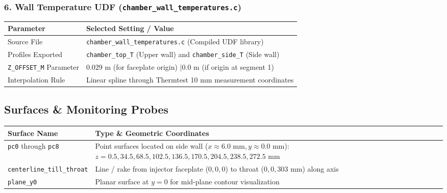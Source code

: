 \documentclass[11pt,a4paper]{article}
\begin{document}
\subsubsection*{6. Wall Temperature UDF (\texttt{chamber\_wall\_temperatures.c})}

\begin{tabularx}{\textwidth}{L{4.5cm} Y}
\toprule
\textbf{Parameter} & \textbf{Selected Setting / Value} \\
\midrule
Source File & \texttt{chamber\_wall\_temperatures.c} (Compiled UDF library) \\
Profiles Exported & \texttt{chamber\_top\_T} (Upper wall) and \texttt{chamber\_side\_T} (Side wall) \\
\texttt{Z\_OFFSET\_M} Parameter & $0.029\text{ m}$ (for faceplate origin) \quad$\vert$\quad $0.0\text{ m}$ (if origin at segment 1) \\
Interpolation Rule & Linear spline through Thermtest 10 mm measurement coordinates \\
\bottomrule
\end{tabularx}

\subsection{Surfaces \& Monitoring Probes}
\begin{tabularx}{\textwidth}{L{4.8cm} Y}
\toprule
\textbf{Surface Name} & \textbf{Type \& Geometric Coordinates} \\
\midrule
\texttt{pc0} through \texttt{pc8} & Point surfaces located on side wall ($x \approx 6.0\text{ mm}, y \approx 0.0\text{ mm}$): \newline $z = 0.5, 34.5, 68.5, 102.5, 136.5, 170.5, 204.5, 238.5, 272.5\text{ mm}$ \\
\texttt{centerline\_till\_throat} & Line / rake from injector faceplate ($0,0,0$) to throat ($0,0,303\text{ mm}$) along axis \\
\texttt{plane\_y0} & Planar surface at $y = 0$ for mid-plane contour visualization \\
\bottomrule
\end{tabularx}
\end{document}
